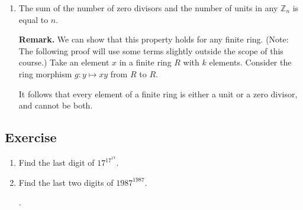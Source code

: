 \documentclass{article}
\newcounter{counter}
\newcommand{\Exercise}{Exercise \stepcounter{counter}\thecounter}
\begin{document}
\begin{enumerate}
        \vspace{1mm}
        \textbf{Remark.} Note that $[a] \in \mathbb{Z}_{14}$ was a unit iff $\gcd(a, 14) = 1$. We can prove this statement from B\'ezout's identity. As a starting point, the reverse implication is as follows: if $\gcd(a, 14) = 1$, then we can find $x, y \in \mathbb{Z}$ for which $ax + 14y = 1$; in $\mathbb{Z}_{14}$, this means $ax = 1$ for some $x \in \mathbb{Z}_{14}$, so $a$ is a unit.
        \item The sum of the number of zero divisors and the number of units in any $\mathbb{Z}_{n}$ is equal to $n$. 
        
        \vspace{1mm}
        \textbf{Remark.}
        We can show that this property holds for any finite ring. (Note: The following proof will use some terms slightly outside the scope of this course.) Take an element $x$ in a finite ring $R$ with $k$ elements. Consider the ring morphism $g: y \mapsto xy$ from $R$ to $R$.
        It follows that every element of a finite ring is either a unit or a zero divisor, and cannot be both.
    \end{enumerate}

\subsection*{\Exercise}
    \begin{enumerate}
        \item Find the last digit of $17^{17^{17}}$.
        \item Find the last two digits of $1987^{1987}$. 
        
        .
        
    \end{enumerate}
\end{document}
